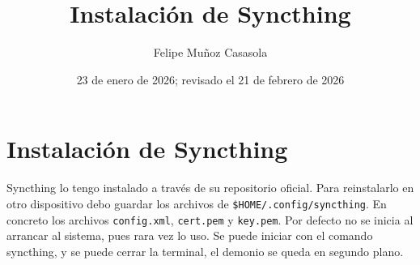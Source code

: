 \documentclass{article}
\title{Instalación de Syncthing}
\author{Felipe Muñoz Casasola}
\date{23 de enero de 2026; revisado el 21 de febrero de 2026}
\begin{document}
    \maketitle
    \clearpage
    \section{Instalación de Syncthing}
    Syncthing lo tengo instalado a través de su repositorio oficial. Para
    reinstalarlo en otro dispositivo debo guardar los archivos de
    \texttt{\$HOME/.config/syncthing}. En concreto los archivos
    \texttt{config.xml}, \texttt{cert.pem} y \texttt{key.pem}. Por defecto no se
    inicia al arrancar al
    sistema, pues rara vez lo uso. Se puede iniciar con el comando syncthing, y
    se puede cerrar la terminal, el demonio se queda en segundo plano.
\end{document}
